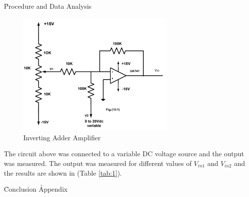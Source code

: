 \documentclass[12pt]{article}
\begin{document}
\h{Procedure and Data Analysis}
\begin{figure}[H]
    \centering
    \includegraphics[width=0.7\textwidth]{assets/main/2023-08-27-18-37-15.png}
    \caption{Inverting Adder Amplifier}
    \label{fig:1}
\end{figure}
The circuit above was connected to a variable DC voltage source and the output was measured. The output was measured for different values of $V_{in1}$ and $V_{in2}$ and the results are shown in (Table \ref{tab:1}).



\clearpage
\h{Conclusion}
\clearpage
{}
\clearpage
\h*{Appendix}
\clearpage
\end{document}

